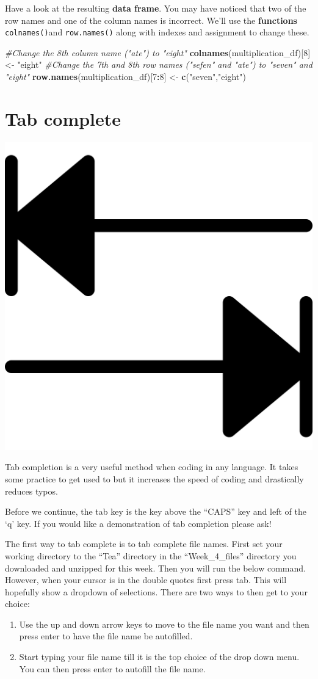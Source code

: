 \documentclass[]{book}
\newenvironment{Shaded}{\begin{snugshade}}{\end{snugshade}}
\newcommand{\KeywordTok}[1]{\textcolor[rgb]{0.13,0.29,0.53}{\textbf{#1}}}
\newcommand{\DecValTok}[1]{\textcolor[rgb]{0.00,0.00,0.81}{#1}}
\newcommand{\StringTok}[1]{\textcolor[rgb]{0.31,0.60,0.02}{#1}}
\newcommand{\CommentTok}[1]{\textcolor[rgb]{0.56,0.35,0.01}{\textit{#1}}}
\newcommand{\OperatorTok}[1]{\textcolor[rgb]{0.81,0.36,0.00}{\textbf{#1}}}
\newcommand{\NormalTok}[1]{#1}
\providecommand{\tightlist}{%
  \setlength{\itemsep}{0pt}\setlength{\parskip}{0pt}}
\begin{document}
Have a look at the resulting \textbf{data frame}. You may have noticed
that two of the row names and one of the column names is incorrect.
We'll use the \textbf{functions} \texttt{colnames()}and
\texttt{row.names()} along with indexes and assignment to change these.

\begin{Shaded}
\begin{Highlighting}[]
\CommentTok{#Change the 8th column name ("ate") to "eight"}
\KeywordTok{colnames}\NormalTok{(multiplication_df)[}\DecValTok{8}\NormalTok{] <-}\StringTok{ "eight"}
\CommentTok{#Change the 7th and 8th row names ("sefen" and "ate") to "seven" and "eight"}
\KeywordTok{row.names}\NormalTok{(multiplication_df)[}\DecValTok{7}\OperatorTok{:}\DecValTok{8}\NormalTok{] <-}\StringTok{ }\KeywordTok{c}\NormalTok{(}\StringTok{"seven"}\NormalTok{,}\StringTok{"eight"}\NormalTok{)}
\end{Highlighting}
\end{Shaded}

\section{Tab complete}\label{tab-complete}

\begin{center}\includegraphics[width=0.15\linewidth]{figures/tab} \end{center}

Tab completion is a very useful method when coding in any language. It
takes some practice to get used to but it increases the speed of coding
and drastically reduces typos.

Before we continue, the tab key is the key above the ``CAPS'' key and
left of the `q' key. If you would like a demonstration of tab completion
please ask!

The first way to tab complete is to tab complete file names. First set
your working directory to the ``Tea'' directory in the
``Week\_4\_files'' directory you downloaded and unzipped for this week.
Then you will run the below command. However, when your cursor is in the
double quotes first press tab. This will hopefully show a dropdown of
selections. There are two ways to then get to your choice:

\begin{enumerate}
\def\labelenumi{\arabic{enumi}.}
\tightlist
\item
  Use the up and down arrow keys to move to the file name you want and
  then press enter to have the file name be autofilled.
\item
  Start typing your file name till it is the top choice of the drop down
  menu. You can then press enter to autofill the file name.
\end{enumerate}
\end{document}
